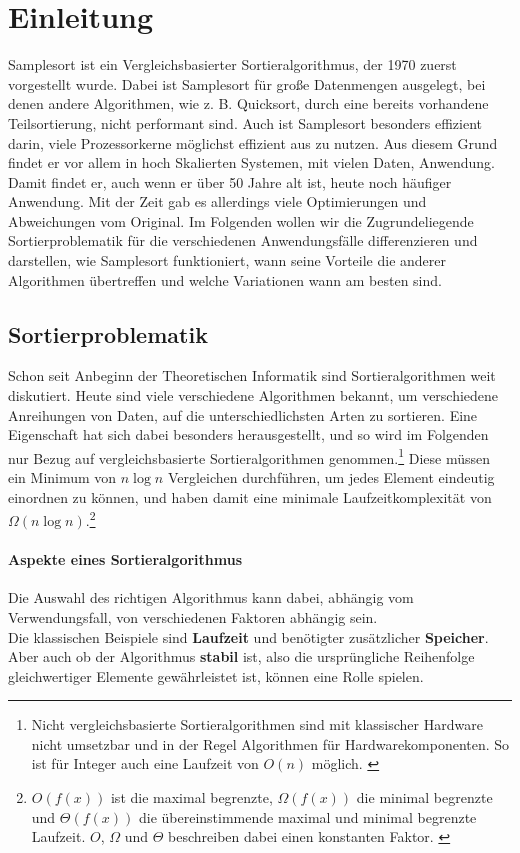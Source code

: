 \section{Einleitung}
    Samplesort ist ein Vergleichsbasierter Sortieralgorithmus, der 1970 zuerst vorgestellt wurde. \autocite{frazer-1970}
    Dabei ist Samplesort für große Datenmengen ausgelegt, bei denen andere Algorithmen, wie z. B. Quicksort, durch eine bereits vorhandene Teilsortierung, nicht performant sind.
    Auch ist Samplesort besonders effizient darin, viele Prozessorkerne möglichst effizient aus zu nutzen.
    Aus diesem Grund findet er vor allem in hoch Skalierten Systemen, mit vielen Daten, Anwendung.\\
    Damit findet er, auch wenn er über 50 Jahre alt ist, heute noch häufiger Anwendung.
    Mit der Zeit gab es allerdings viele Optimierungen und Abweichungen vom Original.
    Im Folgenden wollen wir die Zugrundeliegende Sortierproblematik für die verschiedenen Anwendungsfälle differenzieren und darstellen, wie Samplesort funktioniert, wann seine Vorteile die anderer Algorithmen übertreffen und welche Variationen wann am besten sind.
	\subsection{Sortierproblematik}
		Schon seit Anbeginn der Theoretischen Informatik sind Sortieralgorithmen weit diskutiert.
		Heute sind viele verschiedene Algorithmen bekannt, um verschiedene Anreihungen von Daten, auf die unterschiedlichsten Arten zu sortieren.
		Eine Eigenschaft hat sich dabei besonders herausgestellt, und so wird im Folgenden nur Bezug auf vergleichsbasierte Sortieralgorithmen genommen.\footnote{Nicht vergleichsbasierte Sortieralgorithmen sind mit klassischer Hardware nicht umsetzbar und in der Regel Algorithmen für Hardwarekomponenten. So ist für Integer auch eine Laufzeit von $O(n)$ möglich. \autocite{abdel-hafeez-2017}}
		Diese müssen ein Minimum von $n\log{n}$ Vergleichen durchführen, um jedes Element eindeutig einordnen zu können, und haben damit eine minimale Laufzeitkomplexität von $\Omega(n\log{n})$.\footnote{$O(f(x))$ ist die maximal begrenzte, $\Omega(f(x))$ die minimal begrenzte und $\Theta(f(x))$ die übereinstimmende maximal und minimal begrenzte Laufzeit. $O$, $\Omega$ und $\Theta$ beschreiben dabei einen konstanten Faktor. \autocite[4]{sedgewick-1996}}
	
		\paragraph{Aspekte eines Sortieralgorithmus}
			Die Auswahl des richtigen Algorithmus kann dabei, abhängig vom Verwendungsfall, von verschiedenen Faktoren abhängig sein.\\
			Die klassischen Beispiele sind \textbf{Laufzeit} und benötigter zusätzlicher \textbf{Speicher}.
			Aber auch ob der Algorithmus \textbf{stabil} ist, also die ursprüngliche Reihenfolge gleichwertiger Elemente gewährleistet ist, können eine Rolle spielen.

